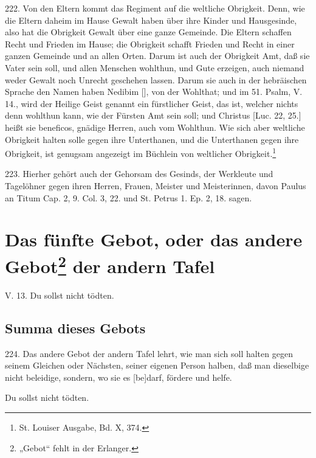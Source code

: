 222. Von den Eltern kommt das Regiment auf die weltliche Obrigkeit. Denn, wie die Eltern daheim im Hause Gewalt haben über ihre Kinder und Hausgesinde, also hat die Obrigkeit Gewalt über eine ganze Gemeinde. Die Eltern schaffen Recht und Frieden im Hause; die Obrigkeit schafft Frieden und Recht in einer ganzen Gemeinde und an allen Orten. Darum ist auch der Obrigkeit Amt, daß sie Vater sein soll, und allen Menschen wohlthun, und Gute erzeigen, auch niemand weder Gewalt noch Unrecht geschehen lassen. Darum sie auch in der hebräischen Sprache den Namen haben Nedibim [], von der Wohlthat; und im 51. Psalm, V. 14., wird der Heilige Geist genannt ein fürstlicher Geist, das ist, welcher nichts denn wohlthun kann, wie der Fürsten Amt sein soll; und Christus [Luc. 22, 25.] heißt sie beneficos, gnädige Herren, auch vom Wohlthun. Wie sich aber weltliche Obrigkeit halten solle gegen ihre Unterthanen, und die Unterthanen gegen ihre Obrigkeit, ist genugsam angezeigt im Büchlein von weltlicher Obrigkeit.\footnote{St. Louiser Ausgabe, Bd. X, 374.}

223. Hierher gehört auch der Gehorsam des Gesinds, der Werkleute und Tagelöhner gegen ihren Herren, Frauen, Meister und Meisterinnen, davon Paulus an Titum Cap. 2, 9. Col. 3, 22. und St. Petrus 1. Ep. 2, 18. sagen.

\section[Das fünfte Gebot, oder das andere Gebot der andern]{Das fünfte Gebot, oder das andere Gebot\footnote{„Gebot“ fehlt in der Erlanger.} der andern Tafel}

\begin{schriftzitat}
V. 13. Du sollst nicht tödten.
\end{schriftzitat}

\subsection{Summa dieses Gebots}

224. Das andere Gebot der andern Tafel lehrt, wie man sich soll halten gegen seinem Gleichen oder Nächsten, seiner eigenen Person halben, daß man dieselbige nicht beleidige, sondern, wo sie es [be]darf, fördere und helfe.

\begin{schriftzitat}
Du sollst nicht tödten.
\end{schriftzitat}

